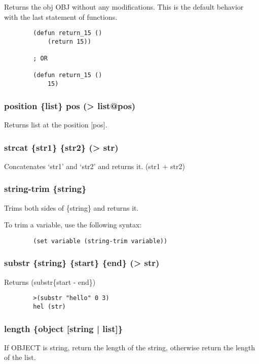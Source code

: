 \documentclass{article}
\begin{document}
	Returns the obj OBJ without any modifications. This is the default behavior with the last statement of functions.
	
	\begin{lstlisting}
		(defun return_15 ()
			(return 15))
		
		; OR
		
		(defun return_15 ()
			15)
	\end{lstlisting}
	
	\subsubsection{position \{list\}  pos (> list@pos)}

	Returns list at the position [pos].
	
	\subsubsection{strcat \{str1\} \{str2\} (> str)}
	
	Concatenates `str1' and `str2' and returns it. (str1 + str2)
	
	\subsubsection{string-trim \{string\}}

	Trims both sides of \{string\} and returns it.
	
	To trim a variable, use the following syntax:
	
	\begin{lstlisting}
		(set variable (string-trim variable))
	\end{lstlisting}

	\subsubsection{substr \{string\} \{start\} \{end\} (> str)}
	
	Returns (substr\{start - end\})
	
	\begin{lstlisting}
		>(substr "hello" 0 3)
		hel (str)
	\end{lstlisting}

	\subsubsection{length \{object [string | list]\}}

	If OBJECT is string, return the length of the string, otherwise return the length of the list.
	\newpage
\end{document}
